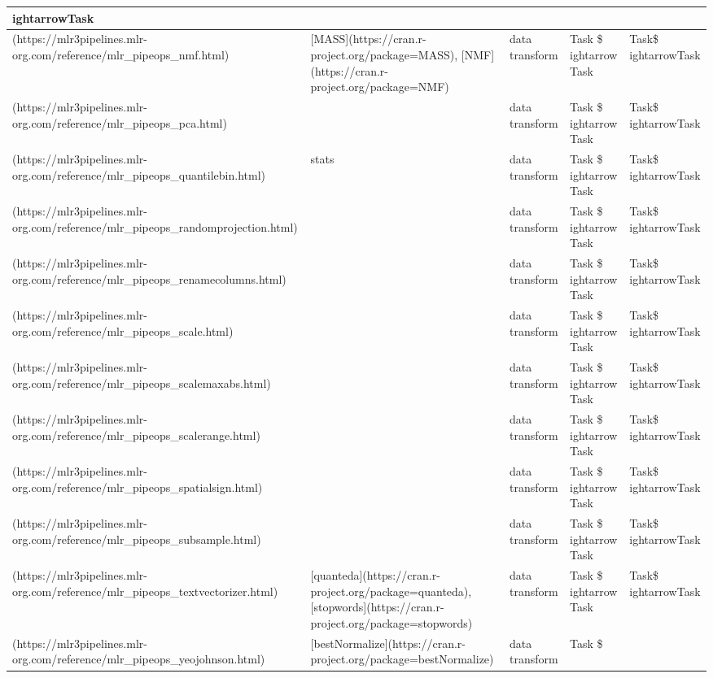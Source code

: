 \documentclass[
]{scrbook}
\begin{document}
\begin{tabular}{l|l|l|l|l}
ightarrowTask\\
\hline
[`nmf`](https://mlr3pipelines.mlr-org.com/reference/mlr\_pipeops\_nmf.html) & [MASS](https://cran.r-project.org/package=MASS), [NMF](https://cran.r-project.org/package=NMF) & data transform & Task \$
ightarrow Task & Task\$
ightarrowTask\\
\hline
[`pca`](https://mlr3pipelines.mlr-org.com/reference/mlr\_pipeops\_pca.html) &  & data transform & Task \$
ightarrow Task & Task\$
ightarrowTask\\
\hline
[`quantilebin`](https://mlr3pipelines.mlr-org.com/reference/mlr\_pipeops\_quantilebin.html) & stats & data transform & Task \$
ightarrow Task & Task\$
ightarrowTask\\
\hline
[`randomprojection`](https://mlr3pipelines.mlr-org.com/reference/mlr\_pipeops\_randomprojection.html) &  & data transform & Task \$
ightarrow Task & Task\$
ightarrowTask\\
\hline
[`renamecolumns`](https://mlr3pipelines.mlr-org.com/reference/mlr\_pipeops\_renamecolumns.html) &  & data transform & Task \$
ightarrow Task & Task\$
ightarrowTask\\
\hline
[`scale`](https://mlr3pipelines.mlr-org.com/reference/mlr\_pipeops\_scale.html) &  & data transform & Task \$
ightarrow Task & Task\$
ightarrowTask\\
\hline
[`scalemaxabs`](https://mlr3pipelines.mlr-org.com/reference/mlr\_pipeops\_scalemaxabs.html) &  & data transform & Task \$
ightarrow Task & Task\$
ightarrowTask\\
\hline
[`scalerange`](https://mlr3pipelines.mlr-org.com/reference/mlr\_pipeops\_scalerange.html) &  & data transform & Task \$
ightarrow Task & Task\$
ightarrowTask\\
\hline
[`spatialsign`](https://mlr3pipelines.mlr-org.com/reference/mlr\_pipeops\_spatialsign.html) &  & data transform & Task \$
ightarrow Task & Task\$
ightarrowTask\\
\hline
[`subsample`](https://mlr3pipelines.mlr-org.com/reference/mlr\_pipeops\_subsample.html) &  & data transform & Task \$
ightarrow Task & Task\$
ightarrowTask\\
\hline
[`textvectorizer`](https://mlr3pipelines.mlr-org.com/reference/mlr\_pipeops\_textvectorizer.html) & [quanteda](https://cran.r-project.org/package=quanteda), [stopwords](https://cran.r-project.org/package=stopwords) & data transform & Task \$
ightarrow Task & Task\$
ightarrowTask\\
\hline
[`yeojohnson`](https://mlr3pipelines.mlr-org.com/reference/mlr\_pipeops\_yeojohnson.html) & [bestNormalize](https://cran.r-project.org/package=bestNormalize) & data transform & Task \$

\end{tabular}
\end{document}
